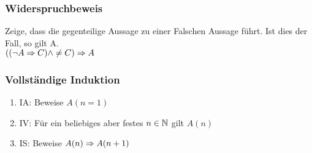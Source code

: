 \subsubsection*{Widerspruchbeweis}
Zeige, dass die gegenteilige Aussage zu einer Falschen Aussage führt. Ist dies der Fall, so gilt A.\\
$((\neg A \Rightarrow C) \land \neq C) \Rightarrow A$
\subsubsection*{Vollständige Induktion}
\begin{enumerate}[noitemsep]
    \item IA: Beweise $A(n = 1)$
    \item IV: Für ein beliebiges aber festes $n \in \mathbb N$ gilt $A(n)$
    \item IS: Beweise $A(n) \Rightarrow A(n+1)$
\end{enumerate}

